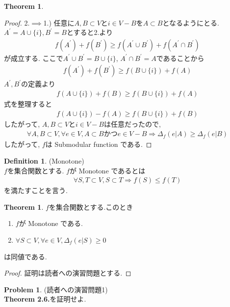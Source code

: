 \documentclass[11pt, a4paper, dvipdfmx]{jsarticle}
\theoremstyle{definition}
\newtheorem{Definition+}[Axiom+]{Definition}
\newtheorem{Theorem+}[Axiom+]{Theorem}
\newtheorem{Problem+}[Axiom+]{Problem}
\begin{document}
\begin{Theorem+}
\begin{proof}
        2.$\implies$1.) 任意に$A, B\subset V$と$i\in V - B$を$A\subset B$となるようにとる. $A^{'} = A\cup \{i\}, B^{'} = B$とすると2.より
        \begin{align*}
            f(A^{'}) + f(B^{'})\geq f(A^{'}\cup B^{'}) + f(A^{'}\cap B^{'})
        \end{align*}
        が成立する. ここで$A^{'}\cup B^{'} = B\cup\{i\}$, $A^{'}\cap B^{'} = A$であることから
        \begin{align*}
            f(A^{'}) + f(B^{'})\geq f(B\cup\{i\}) + f(A)
        \end{align*}
        $A^{'}, B^{'}$の定義より
        \begin{align*}
            f(A\cup \{i\}) + f(B)\geq f(B\cup\{i\}) + f(A)
        \end{align*}
        式を整理すると
        \begin{align*}
            f(A\cup \{i\}) - f(A)\geq f(B\cup\{i\}) + f(B)
        \end{align*}
        したがって, $A, B\subset V$と$i\in V - B$は任意だったので,
        \begin{align*}
            \forall A, B\subset V, \forall e\in V,A\subset B かつe\in V - B\Longrightarrow \Delta_{f}(e | A)\geq\Delta_{f}(e | B)
        \end{align*}
        したがって, $f$は Submodular function である.
    \end{proof}
\end{Theorem+}
\begin{Definition+}(Monotone)\\
    $f$を集合関数とする. $f$が Monotone であるとは
    \begin{align*}
        \forall S, T\subset V, S\subset T\Longrightarrow f(S)\leq f(T)
    \end{align*}
    を満たすことを言う.
\end{Definition+}
\begin{Theorem+}
    $f$を集合関数とする.このとき
    \begin{enumerate}
        \item $f$が Monotone である.
        \item $\forall S\subset V, \forall e\in V, \Delta_{f}(e | S)\geq 0$
    \end{enumerate}
    は同値である.
    \begin{proof}
        証明は読者への演習問題とする.
    \end{proof}
\end{Theorem+}
\begin{Problem+}(読者への演習問題1)\\
    {\bf Theorem 2.6.}を証明せよ.
\end{Problem+}
\end{document}
